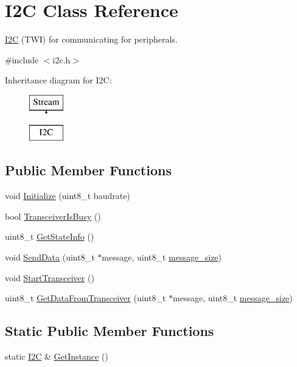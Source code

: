 \hypertarget{class_i2_c}{}\section{I2C Class Reference}
\label{class_i2_c}


\hyperlink{class_i2_c}{I2C} (T\+WI) for communicating for peripherals.  




{\ttfamily \#include $<$i2c.\+h$>$}

Inheritance diagram for I2C\+:\begin{figure}[H]
\begin{center}
\leavevmode
\includegraphics[height=2.000000cm]{class_i2_c}
\end{center}
\end{figure}
\subsection*{Public Member Functions}
\begin{DoxyCompactItemize}
\item 
void \hyperlink{class_i2_c_acfdd142a63b224f178f3edda5f30f2aa}{Initialize} (uint8\+\_\+t baudrate)
\item 
bool \hyperlink{class_i2_c_a3e6747576e7d4abf506296f8675ec3b5}{Transceiver\+Is\+Busy} ()
\item 
uint8\+\_\+t \hyperlink{class_i2_c_ac46dd0197fdfbea2ff6d24b45f2ec67b}{Get\+State\+Info} ()
\item 
void \hyperlink{class_i2_c_a6b0a26e4ebcae7eee8920a70b77fd5c2}{Send\+Data} (uint8\+\_\+t $\ast$message, uint8\+\_\+t \hyperlink{class_i2_c_a88add0edd8c518054944a8188ab11d0c}{message\+\_\+size})
\item 
void \hyperlink{class_i2_c_af8c970cb20a2b5bdcf80ef35c662658f}{Start\+Transceiver} ()
\item 
uint8\+\_\+t \hyperlink{class_i2_c_a2023e5108a9bfb4ac09f509f74137307}{Get\+Data\+From\+Transceiver} (uint8\+\_\+t $\ast$message, uint8\+\_\+t \hyperlink{class_i2_c_a88add0edd8c518054944a8188ab11d0c}{message\+\_\+size})
\end{DoxyCompactItemize}
\subsection*{Static Public Member Functions}
\begin{DoxyCompactItemize}
\item 
static \hyperlink{class_i2_c}{I2C} \& \hyperlink{class_i2_c_ade3b5d971432c82867201123965cf3fd}{Get\+Instance} ()
\end{DoxyCompactItemize}
